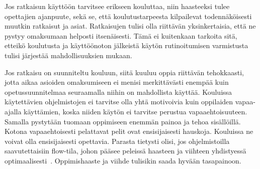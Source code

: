 \documentclass[utf8,bachelor]{gradu3}
\begin{document}
Jos ratkaisun käyttöön tarvitsee erikseen kouluttaa, niin haasteeksi tulee opettajien ajanpuute, sekä se, että koulutustarpeesta kilpailevat todennäköisesti muutkin ratkaisut ja asiat. Ratkaisujen tulisi olla riittävän yksinkertaisia, että ne pystyy omaksumaan helposti  itsenäisesti. Tämä ei kuitenkaan tarkoita sitä, etteikö koulutusta ja käyttöönoton jälkeistä käytön rutinoitumisen varmistusta tulisi järjestää mahdollisuuksien mukaan.

Jos ratkaisu on suunniteltu kouluun, siitä kuuluu oppia riittävän tehokkaasti, jotta aikaa asioiden omaksumiseen ei menisi merkittävästi enempää kuin opetussuunnitelmaa seuraamalla niihin on mahdollista käyttää. Kouluissa käytettävien ohjelmistojen ei tarvitse olla yhtä motivoivia kuin oppilaiden vapaa-ajalla käyttämien, koska niiden käytön ei tarvitse perustua vapaaehtoisuuteen. Samalla pystytään tuomaan oppimiseen enemmän painoa ja tehoa sisällöillä. Kotona vapaaehtoisesti pelattavat pelit ovat ensisijaisesti hauskoja. Kouluissa ne voivat olla ensisijaisesti opettavia. Parasta tietysti olisi, jos ohjelmistoilla saavutettaisiin flow-tila, johon pääsee peleissä haasteen ja viihteen yhdistyessä optimaalisesti~\parencite[][]{flow}. Oppimishaaste ja viihde tulisikin saada hyvään tasapainoon.


\printbibliography
\end{document}
